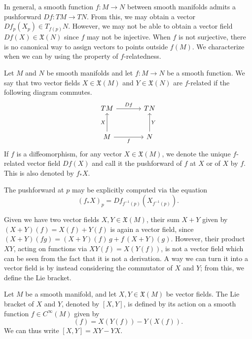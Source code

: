 \documentclass[a4paper,12pt]{article}
\begin{document}
In general, a smooth function $f \colon M \to N$ between smooth manifolds admits a pushforward $Df \colon TM \to TN$.
From this, we may obtain a vector $Df_p(X_p) \in T_{f(p)} N$.
However, we may not be able to obtain a vector field $Df(X) \in \mathfrak{X}(N)$ since $f$ may not be injective.
When $f$ is not surjective, there is no canonical way to assign vectors to points outside $f(M)$.
We characterize when we can by using the property of $f$-relatedness.
\begin{definition}[$f$-Related]\label{f-related}
    Let $M$ and $N$ be smooth manifolds and let $f \colon M \to N$ be a smooth function.
    We say that two vector fields $X \in \mathfrak{X}(M)$ and $Y \in \mathfrak{X}(N)$ are $f$-related if the following diagram commutes.
    \[\begin{tikzcd}[sep=large]
        TM & TN \\
        M & N
        \arrow["Df", from=1-1, to=1-2]
        \arrow["{X}", from=2-1, to=1-1]
        \arrow["{Y}"', from=2-2, to=1-2]
        \arrow["f"', from=2-1, to=2-2]
    \end{tikzcd}\]
    If $f$ is a diffeomorphism, for any vector $X \in \mathfrak{X}(M)$, we denote the unique $f$-related vector field $Df(X)$ and call it the pushforward of $f$ at $X$ or of $X$ by $f$.
    This is also denoted by $f_*X$.
\end{definition}
\begin{remark}
    The pushforward at $p$ may be explicitly computed via the equation
    \begin{equation}
        (f_*X)_p = Df_{f^{-1}(p)}(X_{f^{-1}(p)}).
    \end{equation}
\end{remark}
Given we have two vector fields $X, Y \in \mathfrak{X}(M)$, their sum $X + Y$ given by $(X + Y)(f) = X(f) + Y(f)$ is again a vector field, since $(X + Y)(fg) = (X + Y)(f) \, g + f \, (X + Y)(g)$.
However, their product $XY$, acting on functions via $XY(f) = X(Y(f))$, is not a vector field which can be seen from the fact that it is not a derivation.
A way we can turn it into a vector field is by instead considering the commutator of $X$ and $Y$; from this, we define the Lie bracket.
\begin{definition}\label{def:lie_bracket}
    Let $M$ be a smooth manifold, and let $X, Y \in \mathfrak{X}(M)$ be vector fields.
    The Lie bracket of $X$ and $Y$, denoted by $[X, Y]$, is defined by its action on a smooth function $f \in C^\infty(M)$ given by
    \begin{equation}
        [X, Y](f) = X(Y(f)) - Y(X(f)).
    \end{equation}
    We can thus write $[X, Y] = XY - YX$.
\end{definition}
\end{document}
